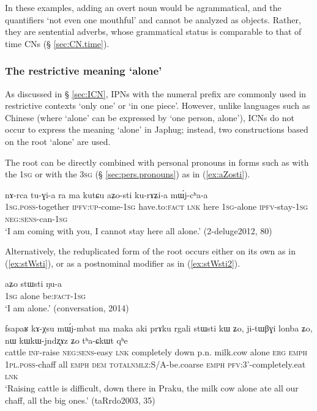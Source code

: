 In these examples, adding an overt noun would be agrammatical, and the quantifiers  `not even one mouthful' and  cannot be analyzed as objects. Rather, they are sentential adverbs, whose grammatical status is comparable to that of time CNs (§ \ref{sec:CN.time}).

\subsubsection{The restrictive meaning `alone'} \label{sec:stWsti}
As discussed in § \ref{sec:ICN},  IPNs with the numeral prefix  are commonly used in restrictive contexts `only one' or  `in one piece'. However, unlike languages such as Chinese (where  `alone' can be expressed by   `one person, alone'), ICNs do not occur to express the meaning `alone' in Japhug; instead, two constructions based on the root  `alone' are used.

The root  can be directly combined with personal pronouns in forms such as  with the \textsc{1sg}  or  with the \textsc{3sg}   (§ \ref{sec:pers.pronouns}) as in (\ref{ex:aZosti}).

\begin{exe}
\ex \label{ex:aZosti}
\gll   nɤ-rca tu-ɣi-a ra ma kutɕu aʑo-sti ku-rɤʑi-a mɯ́j-cʰa-a \\
 \textsc{1sg}.\textsc{poss}-together \textsc{ipfv}:\textsc{up}-come-\textsc{1sg} have.to:\textsc{fact} \textsc{lnk} here \textsc{1sg}-alone \textsc{ipfv}-stay-\textsc{1sg} \textsc{neg}:\textsc{sens}-can-\textsc{1sg} \\
\glt `I am coming with you, I cannot stay here all alone.' (2-deluge2012, 80)
\end{exe}

Alternatively, the reduplicated form of the root  occurs either on its own as in (\ref{ex:stWsti}), or as a postnominal modifier as in (\ref{ex:stWsti2}).

\begin{exe}
\ex \label{ex:stWsti}
\gll aʑo stɯsti ŋu-a \\
\textsc{1sg} alone be:\textsc{fact}-\textsc{1sg} \\
\glt `I am alone.' (conversation, 2014)
\end{exe}

\begin{exe}
\ex \label{ex:stWsti2}
\gll  fsapaʁ kɤ-χsu mɯ́j-mbat ma maka aki prɤku rgali stɯsti kɯ ʑo, ji-tɯβɣi lonba ʑo, nɯ kɯ\redp{}kɯ-jndʐɤz ʑo tʰa-ɕkɯt qʰe \\
cattle \textsc{inf}-raise \textsc{neg}:\textsc{sens}-easy \textsc{lnk} completely down p.n. milk.cow alone \textsc{erg} \textsc{emph} \textsc{1pl}.\textsc{poss}-chaff all \textsc{emph} \textsc{dem} \textsc{total}\redp{}\textsc{nmlz}:S/A-be.coarse \textsc{emph} \textsc{pfv}:3'-completely.eat \textsc{lnk} \\
\glt `Raising cattle is difficult, down there in Praku, the milk cow alone ate all our chaff, all the big ones.' (taRrdo2003, 35)
\end{exe}

